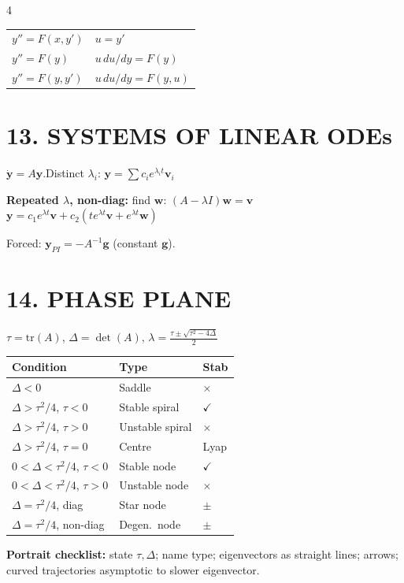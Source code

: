 \documentclass[8pt,a4paper,landscape]{extarticle}
\begin{document}
\begin{multicols}{4}
\begin{tabular}{@{}ll@{}}
$y''=F(x,y')$ & $u=y'$ \\
$y''=F(y)$ & $u\,du/dy=F(y)$ \\
$y''=F(y,y')$ & $u\,du/dy=F(y,u)$ \\
\end{tabular}

\section*{13. SYSTEMS OF LINEAR ODEs}

$\dot{\mathbf{y}}=A\mathbf{y}$.\quad Distinct $\lambda_i$: $\mathbf{y}=\sum c_i e^{\lambda_i t}\mathbf{v}_i$

\textbf{Repeated $\lambda$, non-diag:} find $\mathbf{w}$: $(A-\lambda I)\mathbf{w}=\mathbf{v}$
$\mathbf{y}=c_1e^{\lambda t}\mathbf{v}+c_2(te^{\lambda t}\mathbf{v}+e^{\lambda t}\mathbf{w})$

Forced: $\mathbf{y}_{PI}=-A^{-1}\mathbf{g}$ (constant $\mathbf{g}$).

\section*{14. PHASE PLANE}

$\tau=\mathrm{tr}(A)$, $\Delta=\det(A)$, $\lambda=\frac{\tau\pm\sqrt{\tau^2-4\Delta}}{2}$

\begin{tabular}{@{}p{2.8cm}ll@{}}
\toprule
Condition & Type & Stab \\
\midrule
$\Delta<0$ & Saddle & $\times$ \\
$\Delta>\tau^2/4$, $\tau<0$ & Stable spiral & $\checkmark$ \\
$\Delta>\tau^2/4$, $\tau>0$ & Unstable spiral & $\times$ \\
$\Delta>\tau^2/4$, $\tau=0$ & Centre & Lyap \\
$0<\Delta<\tau^2/4$, $\tau<0$ & Stable node & $\checkmark$ \\
$0<\Delta<\tau^2/4$, $\tau>0$ & Unstable node & $\times$ \\
$\Delta=\tau^2/4$, diag & Star node & $\pm$ \\
$\Delta=\tau^2/4$, non-diag & Degen.\ node & $\pm$ \\
\bottomrule
\end{tabular}

\textbf{Portrait checklist:} state $\tau,\Delta$; name type; eigenvectors as straight lines; arrows; curved trajectories asymptotic to slower eigenvector.


\end{multicols}
\end{document}
